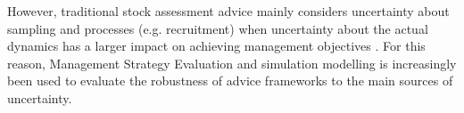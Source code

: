 \documentclass[%
nonumbib,      %
%
]{nrc1}                          %
\begin{document}
However, traditional stock assessment advice mainly considers uncertainty about sampling and processes (e.g. recruitment) when uncertainty about the actual dynamics has a larger impact on achieving management objectives \citep{punt2008refocusing}. For this reason, Management Strategy Evaluation \citep[MSE][]{butterworth1999experiences,kell2003tuna,kell2006operational,punt2007developing,punt2014management,hillary2013sbthcr} and simulation modelling is increasingly been used to evaluate the robustness of advice frameworks to the main sources of uncertainty.
\end{document}
